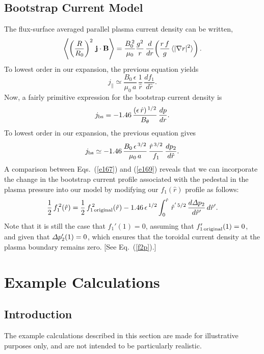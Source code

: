 \documentclass[12pt,prb,aps]{revtex4-1}
\begin{document}
\subsection{Bootstrap Current Model} 
 The flux-surface averaged parallel plasma current density can be written,\cite{fitz93}
 \begin{equation}
 \left\langle \left(\frac{R}{R_0}\right)^2\,{\bf j}\cdot {\bf B}\right\rangle = \frac{B_0^{\,2}}{\mu_0}
 \frac{g^2}{r}\,\frac{d}{dr}\!\left(\frac{r\,f}{g}\,\langle|\nabla r|^2\rangle\right).
 \end{equation}
 To lowest order in our expansion, the previous equation yields
 \begin{equation}\label{e167}
 j_{\parallel} \simeq \frac{B_0\,\epsilon}{\mu_0\,a}\,\frac{1}{\hat{r}}\,\frac{df_1}{d\hat{r}}.
 \end{equation}
 Now, a fairly primitive  expression for the bootstrap current density is\,\cite{boot1}
 \begin{equation}
 j_{\rm bs} = -1.46\,\frac{(\epsilon\,\hat{r})^{\,1/2}}{B_\theta}\,\frac{dp}{dr}.
 \end{equation}
 To lowest order in our expansion, the previous equation gives
 \begin{equation}\label{e169}
 j_{\rm bs} \simeq -1.46\,\frac{B_0\,\epsilon^{\,3/2}}{\mu_0\,a}\,\frac{\hat{r}^{\,3/2}}{f_1}\,\frac{dp_2}{d\hat{r}}.
 \end{equation}
 A comparison between Eqs.~(\ref{e167}) and (\ref{e169}) reveals that we can incorporate the change in the bootstrap current profile associated with the pedestal in the plasma pressure into our model
 by modifying our $f_1(\hat{r})$ profile as follows:
 \begin{equation}
 \frac{1}{2}\,f_1^{\,2}(\hat{r})= \frac{1}{2}\,f_{1\,{\rm original}}^{\,2}(\hat{r}) -1.46\,\epsilon^{\,1/2}\int_0^{\hat{r}}\,\hat{r}^{'\,5/2}\,\frac{d{\mit\Delta} p_2}{d\hat{r}'}\,d\hat{r}'.
 \end{equation}
 Note that it is still the case that $f_1'(1)=0$,
 assuming that $f_{1\,{\rm original}}'(1)=0$, and
 given that ${\mit\Delta} p_2'(1)=0$, 
  which ensures that the toroidal current density at the plasma boundary remains zero. [See Eq.~(\ref{f2p}).]

\section{Example Calculations}\label{sexample}

\subsection{Introduction}
The example calculations described in this section are made for illustrative purposes only, and are not intended to be
particularly realistic. 
\end{document}
